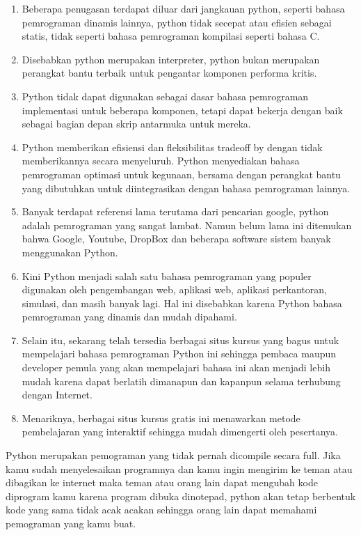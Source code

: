 \begin{enumerate}
\item Beberapa penugasan terdapat diluar dari jangkauan python, seperti bahasa pemrograman dinamis lainnya, python tidak secepat atau efisien sebagai statis, tidak seperti bahasa pemrograman kompilasi seperti bahasa C.
\item Disebabkan python merupakan interpreter, python bukan merupakan perangkat bantu terbaik untuk pengantar komponen performa kritis.
\item Python tidak dapat digunakan sebagai dasar bahasa pemrograman implementasi untuk beberapa komponen, tetapi dapat bekerja dengan baik sebagai bagian depan skrip antarmuka untuk mereka.
\item Python memberikan efisiensi dan fleksibilitas tradeoff by dengan tidak memberikannya secara menyeluruh. Python menyediakan bahasa pemrograman optimasi untuk kegunaan, bersama dengan perangkat bantu yang dibutuhkan untuk diintegrasikan dengan bahasa pemrograman lainnya.
\item Banyak terdapat referensi lama terutama dari pencarian google, python adalah pemrograman yang sangat lambat. Namun belum lama ini ditemukan bahwa Google, Youtube, DropBox dan beberapa software sistem banyak menggunakan Python.
\item Kini Python menjadi salah satu bahasa pemrograman yang populer digunakan oleh pengembangan web, aplikasi web, aplikasi perkantoran, simulasi, dan masih banyak lagi. Hal ini disebabkan karena Python bahasa pemrograman yang dinamis dan mudah dipahami.
\item Selain itu, sekarang telah tersedia berbagai situs kursus yang bagus untuk mempelajari bahasa pemrograman Python ini sehingga pembaca maupun developer pemula yang akan mempelajari bahasa ini akan menjadi lebih mudah karena dapat berlatih dimanapun dan kapanpun selama terhubung dengan Internet.
\item Menariknya, berbagai situs kursus gratis ini menawarkan metode pembelajaran yang interaktif sehingga mudah dimengerti oleh pesertanya.
\end{enumerate}

Python merupakan pemograman yang tidak pernah dicompile secara full. Jika kamu sudah menyelesaikan programnya dan kamu ingin mengirim ke teman atau dibagikan ke internet maka teman atau orang lain dapat mengubah kode diprogram kamu karena program dibuka dinotepad, python akan tetap berbentuk kode yang sama tidak acak acakan sehingga orang lain dapat memahami pemograman yang kamu buat.

